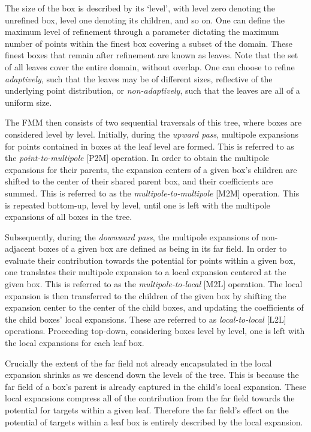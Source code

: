 \documentclass{IEEEcsmag}
\begin{document}
The size of the box is described by its `level', with level zero denoting the unrefined box, level one denoting its children, and so on. One can define the maximum level of refinement through a parameter dictating the maximum number of points within the finest box covering a subset of the domain. These finest boxes that remain after refinement are known as leaves. Note that the set of all leaves cover the entire domain, without overlap. One can choose to refine \textit{adaptively}, such that the leaves may be of different sizes, reflective of the underlying point distribution, or \textit{non-adaptively}, such that the leaves are all of a uniform size.

The FMM then consists of two sequential traversals of this tree, where boxes are considered level by level. Initially, during the \textit{upward pass}, multipole expansions for points contained in boxes at the leaf level are formed. This is referred to as the \textit{point-to-multipole} [P2M] operation. In order to obtain the multipole expansions for their parents, the expansion centers of a given box's children are shifted to the center of their shared parent box, and their coefficients are summed. This is referred to as the \textit{multipole-to-multipole} [M2M] operation. This is repeated bottom-up, level by level, until one is left with the multipole expansions of all boxes in the tree.

Subsequently, during the \textit{downward pass}, the multipole expansions of non-adjacent boxes of a given box are defined as being in its far field. In order to evaluate their contribution towards the potential for points within a given box, one translates their multipole expansion to a local expansion centered at the given box. This is referred to as the \textit{multipole-to-local} [M2L] operation. The local expansion is then transferred to the children of the given box by shifting the expansion center to the center of the child boxes, and updating the coefficients of the child boxes' local expansions. These are referred to as \textit{local-to-local} [L2L] operations. Proceeding top-down, considering boxes level by level, one is left with the local expansions for each leaf box.

Crucially the extent of the far field not already encapsulated in the local expansion shrinks as we descend down the levels of the tree. This is because the far field of a box's parent is already captured in the child's local expansion. These local expansions compress all of the contribution from the far field towards the potential for targets within a given leaf. Therefore the far field's effect on the potential of targets within a leaf box is entirely described by the local expansion.
\end{document}

